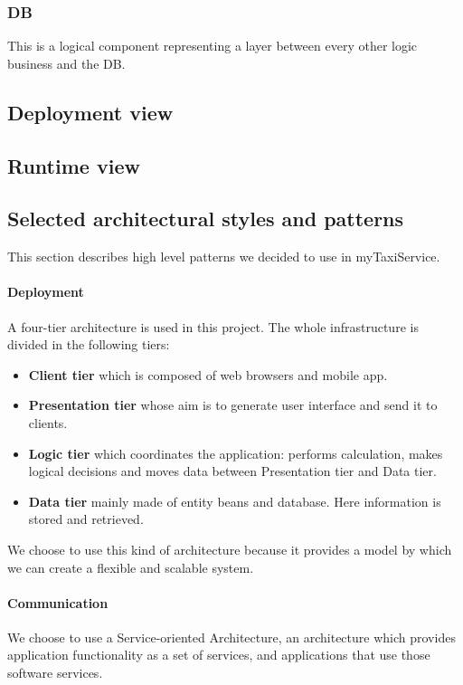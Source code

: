 \newpage
\subsubsection{DB} %
\label{par:db}
This is a logical component representing a layer between every other logic business and the DB.

\newpage
\subsection{Deployment view}
\label{sec:deploy}

\newpage
\subsection{Runtime view}

\newpage
\subsection{Selected architectural styles and patterns}
This section describes high level patterns we decided to use in myTaxiService.

\paragraph{Deployment} A four-tier architecture is used in this project.
The whole infrastructure is divided in the following tiers:

\begin{itemize}
    \item{\textbf{Client tier} which is composed of web browsers and mobile app.}
    \item{\textbf{Presentation tier} whose aim is to generate user interface and send it to clients.}
    \item{\textbf{Logic tier} which coordinates the application: performs calculation, makes logical decisions and moves data between Presentation tier and Data tier.}
    \item{\textbf{Data tier} mainly made of entity beans and database. 
    Here information is stored and retrieved.}
\end{itemize}

We choose to use this kind of architecture because it provides a model by which
we can create a flexible and scalable system.

\paragraph{Communication} We choose to use a Service-oriented Architecture, 
an architecture which provides application functionality as a set of services, 
and applications that use those software services. 


